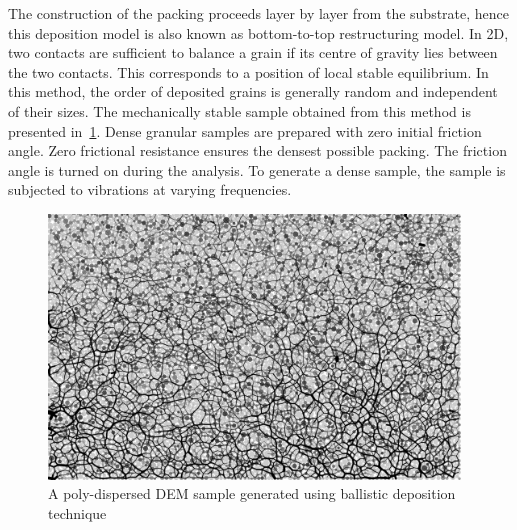 The construction of the packing proceeds layer by layer from the 
substrate, hence this deposition model is also known as bottom-to-top 
restructuring model. 
%
%
In 2D, two contacts are sufficient to balance a grain if its 
centre of gravity lies between the two contacts. This corresponds to a position 
of local stable equilibrium. 
In this method, the order of deposited grains is generally random and 
independent of their sizes. The mechanically stable sample obtained from this 
method is presented in~\cref{fig:DEM_Sample_r6}. 
Dense granular samples are prepared with zero initial friction angle. Zero 
frictional resistance ensures the densest possible packing. The friction angle 
is turned on during the analysis. To generate a dense sample, the sample is 
subjected to vibrations at varying frequencies. 

\begin{figure}[htbp]
\centering
	\includegraphics[width=0.975\textwidth]{DEM_Sample_r6}
	\caption{A poly-dispersed DEM sample generated using ballistic deposition 
	technique}
	\label{fig:DEM_Sample_r6}
\end{figure}

